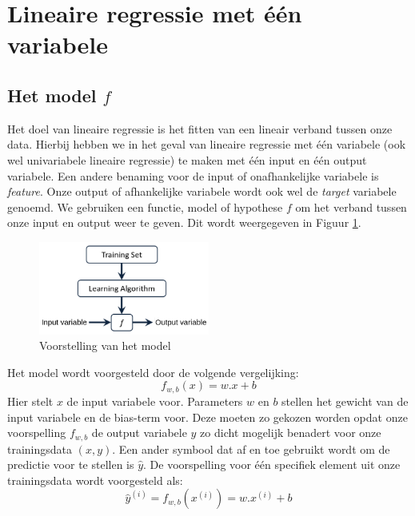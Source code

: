 \section{Lineaire regressie met één variabele}

\subsection{Het model $f$}
Het doel van lineaire regressie is het fitten van een lineair verband tussen onze data. Hierbij hebben we in het geval van lineaire regressie met één variabele (ook wel univariabele lineaire regressie) te maken met één input en één output variabele. Een andere benaming voor de input of onafhankelijke variabele is \textit{feature}. Onze output of afhankelijke variabele wordt ook wel de \textit{target} variabele genoemd. We gebruiken een functie, model of hypothese $f$ om het verband tussen onze input en output weer te geven. Dit wordt weergegeven in Figuur \ref{fig:model-representation}.

\begin{figure}[h]
	\centering
	\includegraphics[width=0.5\textwidth]{images/3-model-representation.png}
	\caption{Voorstelling van het model}
	\label{fig:model-representation}
\end{figure}
\noindent
Het model wordt voorgesteld door de volgende vergelijking:
\begin{equation}
	f_{w,b}(x) = w.x + b
	\label{eq:f-wb}
\end{equation}
Hier stelt $x$ de input variabele voor. Parameters $w$ en $b$ stellen het gewicht van de input variabele en de bias-term voor. Deze moeten zo gekozen worden opdat onze voorspelling $f_{w,b}$ de output variabele $y$ zo dicht mogelijk benadert voor onze trainingsdata $(x,y)$. Een ander symbool dat af en toe gebruikt wordt om de predictie voor te stellen is $\hat{y}$. De voorspelling voor één specifiek element uit onze trainingsdata wordt voorgesteld als:
\begin{equation}
	\hat{y}^{(i)}= f_{w,b}(x^{(i)}) = w.x^{(i)} + b
	\label{eq:f-wb-i}
\end{equation}

